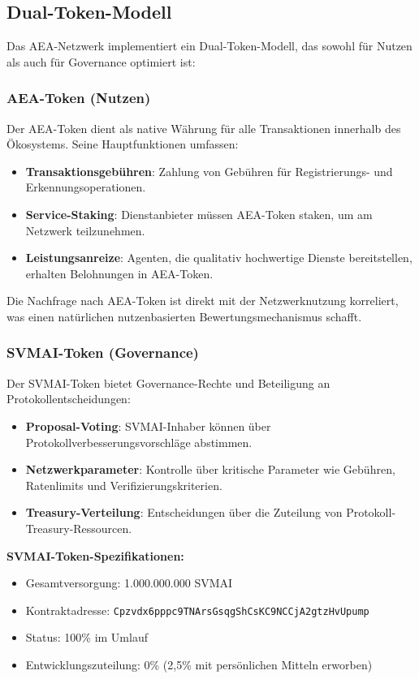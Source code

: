 \documentclass[12pt,a4paper]{article}
\begin{document}
\subsection{Dual-Token-Modell}

Das AEA-Netzwerk implementiert ein Dual-Token-Modell, das sowohl für Nutzen als auch für Governance optimiert ist:

\subsubsection{AEA-Token (Nutzen)}

Der AEA-Token dient als native Währung für alle Transaktionen innerhalb des Ökosystems. Seine Hauptfunktionen umfassen:

\begin{itemize}
\item \textbf{Transaktionsgebühren}: Zahlung von Gebühren für Registrierungs- und Erkennungsoperationen.
\item \textbf{Service-Staking}: Dienstanbieter müssen AEA-Token staken, um am Netzwerk teilzunehmen.
\item \textbf{Leistungsanreize}: Agenten, die qualitativ hochwertige Dienste bereitstellen, erhalten Belohnungen in AEA-Token.
\end{itemize}

Die Nachfrage nach AEA-Token ist direkt mit der Netzwerknutzung korreliert, was einen natürlichen nutzenbasierten Bewertungsmechanismus schafft.

\subsubsection{SVMAI-Token (Governance)}

Der SVMAI-Token bietet Governance-Rechte und Beteiligung an Protokollentscheidungen:

\begin{itemize}
\item \textbf{Proposal-Voting}: SVMAI-Inhaber können über Protokollverbesserungsvorschläge abstimmen.
\item \textbf{Netzwerkparameter}: Kontrolle über kritische Parameter wie Gebühren, Ratenlimits und Verifizierungskriterien.
\item \textbf{Treasury-Verteilung}: Entscheidungen über die Zuteilung von Protokoll-Treasury-Ressourcen.
\end{itemize}

\textbf{SVMAI-Token-Spezifikationen:}
\begin{itemize}
\item Gesamtversorgung: 1.000.000.000 SVMAI
\item Kontraktadresse: \texttt{Cpzvdx6pppc9TNArsGsqgShCsKC9NCCjA2gtzHvUpump}
\item Status: 100\% im Umlauf
\item Entwicklungszuteilung: 0\% (2,5\% mit persönlichen Mitteln erworben)
\end{itemize}
\end{document}
